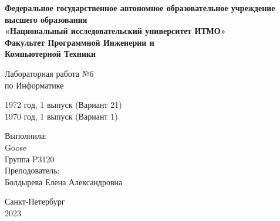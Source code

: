 \begin{center}
\thispagestyle{empty}
\textbf{\large Федеральное государственное автономное 
        образовательное учреждение высшего образования \\
        «Национальный исследовательский университет ИТМО» \\
        Факультет Программной Инженерии и \\
        Компьютерной Техники}
        
\vspace{6cm}
\huge{ Лабораторная работа №6 \\
по Информатике}

\LARGE{1972 год, 1 выпуск (Вариант 21) \\
1970 год, 1 выпуск (Вариант 1)}

\vspace{3cm}
\begin{flushright}
\large { Выполнила: \\
Goose \\
Группа P3120 \\
Преподователь: \\
Болдырева Елена Александровна }
\end{flushright}
\vspace{8cm}
\large {Санкт-Петербург \\
2023}
\end{center}